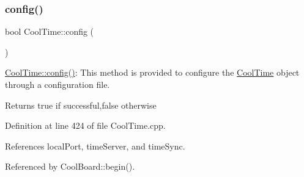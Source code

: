 \subsubsection{\texorpdfstring{config()}{config()}\hspace{0.1cm}{\footnotesize\ttfamily [1/2]}}
{\footnotesize\ttfamily bool Cool\+Time\+::config (\begin{DoxyParamCaption}{ }\end{DoxyParamCaption})}

\hyperlink{classCoolTime_a87c28260c1bc77091162cbcf1ee2e129}{Cool\+Time\+::config()}\+: This method is provided to configure the \hyperlink{classCoolTime}{Cool\+Time} object through a configuration file.

\begin{DoxyReturn}{Returns}
true if successful,false otherwise 
\end{DoxyReturn}


Definition at line 424 of file Cool\+Time.\+cpp.



References local\+Port, time\+Server, and time\+Sync.



Referenced by Cool\+Board\+::begin().


